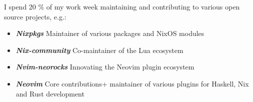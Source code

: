 \documentclass[11pt,a4paper,ngerman,sans]{moderncv}
\begin{document}
{
  I spend 20 \% of my work week maintaining and contributing to various open source projects, e.g.:\newline
  \begin{itemize}
    \item \textbf{\emph{Nixpkgs}} Maintainer of various packages and NixOS modules\newline
    \item \textbf{\emph{Nix-community}} Co-maintainer of the Lua ecosystem\newline
    \item \textbf{\emph{Nvim-neorocks}} Innovating the Neovim plugin ecosystem\newline
    \item \textbf{\emph{Neovim}} Core contributions\newline + maintainer of various plugins for Haskell, Nix and Rust development\newline
  \end{itemize}
}
{}
\end{document}
